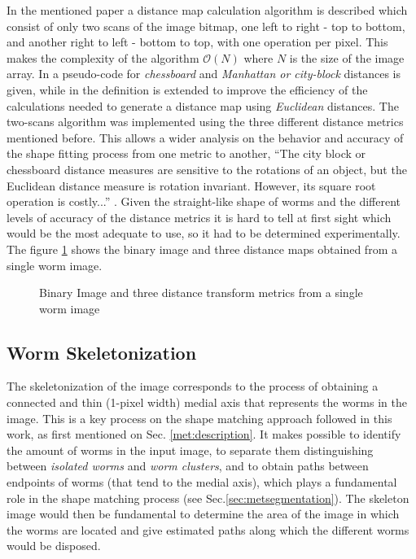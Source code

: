 In the mentioned paper a distance map calculation algorithm is described which consist
of only two scans of the image bitmap, one left to right - top to bottom, and another
right to left - bottom to top, with one operation per pixel. This makes the complexity
of the algorithm $\mathcal{O}(N)$ where $N$ is the size of the image array.
In \cite[p.197]{fastdt} a pseudo-code for \emph{chessboard} and 
\emph{Manhattan or city-block} distances is given, while in \cite[p.198]{fastdt} the 
definition is extended to improve the efficiency of the calculations needed to 
generate a distance map using \emph{Euclidean} distances.
The two-scans algorithm was implemented using the three different distance metrics
mentioned before. This allows a wider analysis on the behavior and accuracy of the shape 
fitting process from one metric to another, ``The city block or chessboard distance
measures are sensitive to the rotations of an object, but the Euclidean distance
measure is rotation invariant. However, its square root operation is costly...''
\cite[p.332]{eucskeleton}. Given the straight-like shape of worms and the different levels
of accuracy of the distance metrics it is hard to tell at first sight which would be 
the most adequate to use, so it had to be determined experimentally.
The figure \ref{fig:distance} shows the binary image and three distance maps obtained 
from a single worm image.

\begin{figure}[h t b p ! H]
  \centering
\qquad
\qquad                
\qquad
  \caption{Binary Image and three distance transform metrics from a single worm image}
  \label{fig:distance}
\end{figure}


\subsection{Worm Skeletonization}
\label{sec:metsk}

The skeletonization of the image corresponds to the process of obtaining a 
connected and thin (1-pixel width) medial axis that represents the worms in the 
image. This is a key process on the shape matching
approach followed in this work, as first mentioned on Sec. \ref{met:description}.
It makes possible to identify the amount of worms in the input image, to separate them 
distinguishing between \emph{isolated worms} and \emph{worm clusters}, and to
obtain paths between endpoints 
of worms (that tend to the medial axis), which plays a fundamental role in the 
shape matching process (see Sec.\ref{sec:metsegmentation}). The skeleton
image would then be fundamental to determine the area of the image in which
the worms are located and give estimated paths along which the different
worms would be disposed. \\

